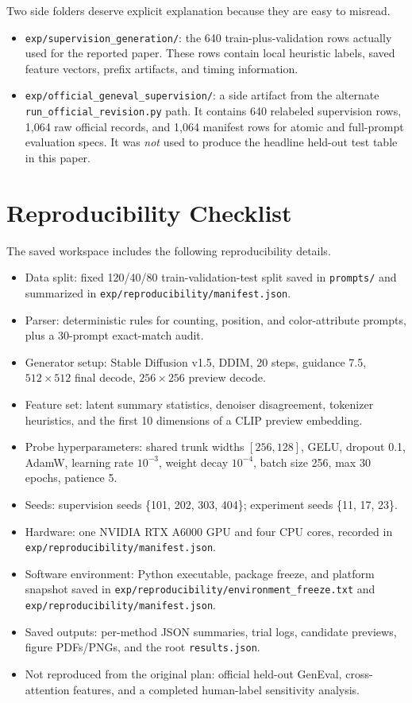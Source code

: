 \documentclass{article}
\begin{document}
Two side folders deserve explicit explanation because they are easy to misread.
\begin{itemize}
  \item \texttt{exp/supervision\_generation/}: the 640 train-plus-validation rows actually used for the reported paper. These rows contain local heuristic labels, saved feature vectors, prefix artifacts, and timing information.
  \item \texttt{exp/official\_geneval\_supervision/}: a side artifact from the alternate \texttt{run\_official\_revision.py} path. It contains 640 relabeled supervision rows, 1{,}064 raw official records, and 1{,}064 manifest rows for atomic and full-prompt evaluation specs. It was \emph{not} used to produce the headline held-out test table in this paper.
\end{itemize}

\section{Reproducibility Checklist}
\label{app:repro}
The saved workspace includes the following reproducibility details.
\begin{itemize}
  \item Data split: fixed 120/40/80 train-validation-test split saved in \texttt{prompts/} and summarized in \texttt{exp/reproducibility/manifest.json}.
  \item Parser: deterministic rules for counting, position, and color-attribute prompts, plus a 30-prompt exact-match audit.
  \item Generator setup: Stable Diffusion v1.5, DDIM, 20 steps, guidance 7.5, $512\times512$ final decode, $256\times256$ preview decode.
  \item Feature set: latent summary statistics, denoiser disagreement, tokenizer heuristics, and the first 10 dimensions of a CLIP preview embedding.
  \item Probe hyperparameters: shared trunk widths $[256,128]$, GELU, dropout 0.1, AdamW, learning rate $10^{-3}$, weight decay $10^{-4}$, batch size 256, max 30 epochs, patience 5.
  \item Seeds: supervision seeds \{101, 202, 303, 404\}; experiment seeds \{11, 17, 23\}.
  \item Hardware: one NVIDIA RTX A6000 GPU and four CPU cores, recorded in \texttt{exp/reproducibility/manifest.json}.
  \item Software environment: Python executable, package freeze, and platform snapshot saved in \texttt{exp/reproducibility/environment\_freeze.txt} and \texttt{exp/reproducibility/manifest.json}.
  \item Saved outputs: per-method JSON summaries, trial logs, candidate previews, figure PDFs/PNGs, and the root \texttt{results.json}.
  \item Not reproduced from the original plan: official held-out GenEval, cross-attention features, and a completed human-label sensitivity analysis.
\end{itemize}
\end{document}
